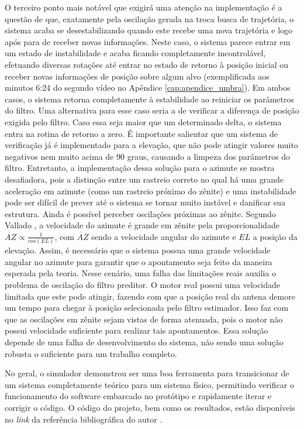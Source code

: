 O terceiro ponto mais notável que exigirá uma atenção na implementação é a questão de que, exatamente pela oscilação gerada na troca busca de trajetória, o sistema acaba se desestabilizando quando este recebe uma nova trajetória e logo após para de receber novas informações.
Neste caso, o sistema parece entrar em um estado de instabilidade e acaba ficando completamente incontrolável, efetuando diversas rotações até entrar no estado de retorno à posição inicial ou receber novas informações de posição sobre algum alvo (exemplificada aos minutos 6:24 do segundo vídeo no Apêndice \ref{cap:apendice_umbra}).
Em ambos casos, o sistema retorna completamente à estabilidade ao reiniciar os parâmetros do filtro.
Uma alternativa para esse caso seria a de verificar a diferença de posição exigida pelo filtro. Caso essa seja maior que um determinado delta, o sistema entra na rotina de retorno a zero.
É importante salientar que um sistema de verificação já é implementado para a elevação, que não pode atingir valores muito negativos nem muito acima de 90 graus, causando a limpeza dos parâmetros do filtro.
Entretanto, a implementação dessa solução para o azimute se mostra desafiadora, pois a distinção entre um rastreio correto no qual há uma grande aceleração em azimute (como um rastreio próximo do zênite) e uma instabilidade pode ser difícil de prever até o sistema se tornar muito instável e danificar sua estrutura.
Ainda é possível perceber oscilações próximas ao zênite. Segundo Vallado \citeyear{vallado2013}, a velocidade do azimute é grande em zênite pela proporcionalidade $\dot{AZ} \propto \frac{1}{cos(EL)}$, com $\dot{AZ}$ sendo a velocidade angular do azimute e $EL$ a posição da elevação.
Assim, é necessário que o sistema possua uma grande velocidade angular no azimute para garantir que o apontamento seja feito da maneira esperada pela teoria.
Nesse cenário, uma falha das limitações reais auxilia o problema de oscilação do filtro preditor.
O motor real possui uma velocidade limitada que este pode atingir, fazendo com que a posição real da antena demore um tempo para chegar à posição selecionada pelo filtro estimador.
Isso faz com que as oscilações em zênite sejam vistas de forma atenuada, pois o motor não possui velocidade suficiente para realizar tais apontamentos.
Essa solução depende de uma falha de desenvolvimento do sistema, não sendo uma solução robusta o suficiente para um trabalho completo.

No geral, o simulador demonstrou ser uma boa ferramenta para transicionar de um sistema completamente teórico para um sistema físico, permitindo verificar o funcionamento do software embarcado no protótipo e rapidamente iterar e corrigir o código.
O código do projeto, bem como os resultados, estão disponíveis no \textit{link} da referência bibliográfica do autor \citeyear{Alves_TG_Trabalho_de_2026}.

